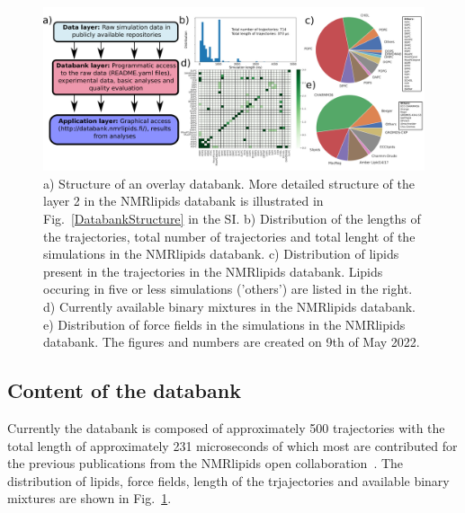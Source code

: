 \documentclass[fleqn,10pt]{wlscirep}
\begin{document}
\begin{figure}
    \centering
    \includegraphics[width = 180mm]{Figures/overlay2.pdf}
    \caption{a) Structure of an overlay databank. 
    More detailed structure of the layer 2 in the NMRlipids databank is illustrated in Fig.~\ref{DatabankStructure} in the SI.
    b) Distribution of the lengths of the trajectories, total number of trajectories and total lenght of the simulations in the NMRlipids databank.
    c) Distribution of lipids present in the trajectories in the NMRlipids databank. Lipids occuring in five or less simulations ('others') are listed in the right. 
    d) Currently available binary mixtures in the NMRlipids databank. 
    e) Distribution of force fields in the simulations in the NMRlipids databank.
    The figures and numbers are created on 9th of May 2022.}
    \label{fig:overlay}
\end{figure}

\subsection{Content of the databank}
Currently the databank is composed of approximately 500 trajectories with the total length of approximately 231 microseconds of which most are contributed for the previous publications from the NMRlipids open collaboration~\cite{botan15,catte16,antila19,bacle21}. The distribution of lipids, force fields, length of the trjajectories and available binary mixtures are shown in Fig.~\ref{fig:overlay}. 
\end{document}
